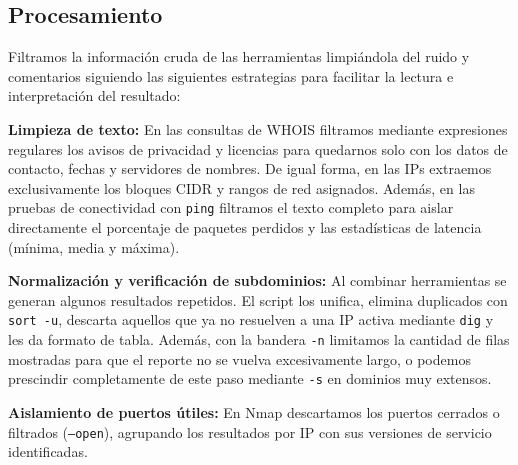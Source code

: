 \subsection*{Procesamiento}

Filtramos la información cruda de las herramientas limpiándola del ruido y comentarios siguiendo las siguientes estrategias para facilitar la lectura e interpretación del resultado:

\begin{itemizeColor}
    \item \textbf{Limpieza de texto:} En las consultas de WHOIS filtramos mediante expresiones regulares los avisos de privacidad y licencias para quedarnos solo con los datos de contacto, fechas y servidores de nombres. De igual forma, en las IPs extraemos exclusivamente los bloques CIDR y rangos de red asignados. Además, en las pruebas de conectividad con \texttt{ping} filtramos el texto completo para aislar directamente el porcentaje de paquetes perdidos y las estadísticas de latencia (mínima, media y máxima).
    \item \textbf{Normalización y verificación de subdominios:} Al combinar herramientas se generan algunos resultados repetidos. El script los unifica, elimina duplicados con \texttt{sort -u}, descarta aquellos que ya no resuelven a una IP activa mediante \texttt{dig} y les da formato de tabla. Además, con la bandera \texttt{-n} limitamos la cantidad de filas mostradas para que el reporte no se vuelva excesivamente largo, o podemos prescindir completamente de este paso mediante \texttt{-s} en dominios muy extensos.
    \item \textbf{Aislamiento de puertos útiles:} En Nmap descartamos los puertos cerrados o filtrados (\texttt{--open}), agrupando los resultados por IP con sus versiones de servicio identificadas.
\end{itemizeColor}
